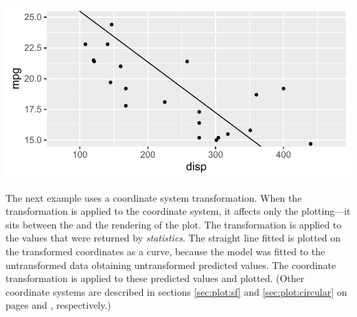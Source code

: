 \documentclass[krantz2]{krantz}\usepackage{knitr}
\begin{document}
\begin{knitrout}\footnotesize
{}\color{fgcolor}\begin{kframe}
\begin{alltt}
\hlstd{(} 
        \hlstd{=} \hlstd{(}    \hlopt{+}
  \hlstd{()} \hlopt{+}
  \hlstd{(} \hlstd{=} \hlstd{,}  \hlstd{=} \hlstd{,}   \hlopt{~}  \hlopt{+}
  \hlstd{(} \hlstd{=} \hlstd{(}\hlstd{,} \hlstd{))}
\end{alltt}
\end{kframe}

{\centering \includegraphics[width=.7\textwidth]{figure/pos-ggplot-basics-07-1} 

}


\end{knitrout}

The next example uses a coordinate system transformation. When the transformation is applied to the coordinate system, it affects only the plotting---it sits between the  and the rendering of the plot. The transformation is applied to the values that were returned by \emph{statistics}. The straight line fitted is plotted on the transformed coordinates as a curve, because the model was fitted to the untransformed data obtaining untransformed predicted values. The coordinate transformation is applied to these predicted values and plotted. (Other coordinate systems are described in sections \ref{sec:plot:sf} and \ref{sec:plot:circular} on pages \pageref{sec:plot:sf} and \pageref{sec:plot:circular}, respectively.)
\end{document}
